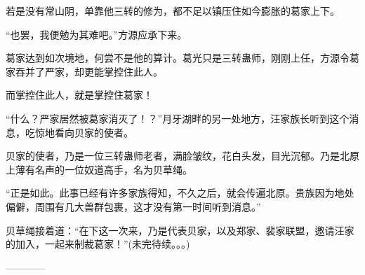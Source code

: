 \begin{this_body}
若是没有常山阴，单靠他三转的修为，都不足以镇压住如今膨胀的葛家上下。

“也罢，我便勉为其难吧。”方源应承下来。

葛家达到如次境地，何尝不是他的算计。葛光只是三转蛊师，刚刚上任，方源令葛家吞并了严家，却更能掌控住此人。

而掌控住此人，就是掌控住葛家！

“什么？严家居然被葛家消灭了！？”月牙湖畔的另一处地方，汪家族长听到这个消息，吃惊地看向贝家的使者。

贝家的使者，乃是一位三转蛊师老者，满脸皱纹，花白头发，目光沉郁。乃是北原上薄有名声的一位奴道高手，名为贝草绳。

“正是如此。此事已经有许多家族得知，不久之后，就会传遍北原。贵族因为地处偏僻，周围有几大兽群包裹，这才没有第一时间听到消息。”

贝草绳接着道：“在下这一次来，乃是代表贝家，以及郑家、裴家联盟，邀请汪家的加入，一起来制裁葛家！”(未完待续。。。)

------------

\end{this_body}

